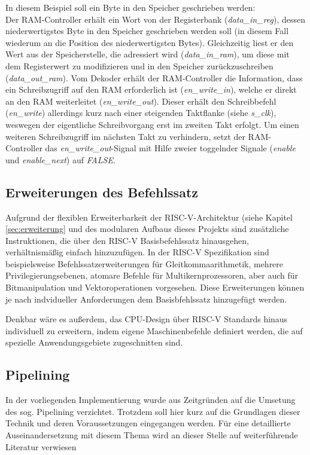 In diesem Beispiel soll ein Byte in den Speicher geschrieben werden:\\
Der RAM-Controller erhält ein Wort von der Registerbank (\textit{data\_in\_reg}), dessen niederwertigstes Byte in den Speicher geschrieben werden soll (in diesem Fall wiederum an die Position des niederwertigsten Bytes).
Gleichzeitig liest er den Wert aus der Speicherstelle, die adressiert wird  (\textit{data\_in\_ram}), um diese mit dem Registerwert zu modifizieren und in den Speicher zurückzuschreiben (\textit{data\_out\_ram}).
Vom Dekoder erhält der RAM-Controller die Information, dass ein Schreibzugriff auf den RAM erforderlich ist (\textit{en\_write\_in}), welche er direkt an den RAM weiterleitet (\textit{en\_write\_out}).
Dieser erhält den Schreibbefehl (\textit{en\_write}) allerdings kurz nach einer steigenden Taktflanke (siehe \textit{s\_clk}), weswegen der eigentliche Schreibvorgang erst im zweiten Takt erfolgt.
Um einen weiteren Schreibzugriff im nächsten Takt zu verhindern, setzt der RAM-Controller das \textit{en\_write\_out}-Signal  mit Hilfe zweier toggelnder Signale (\textit{enable} und \textit{enable\_next}) auf \textit{FALSE}.




\subsection{Erweiterungen des Befehlssatz}

Aufgrund der flexiblen Erweiterbarkeit der RISC-V-Architektur (siehe Kapitel \ref{sec:erweiterung} und des modularen Aufbaus dieses Projekts sind zusätzliche Instruktionen, die über den RISC-V Basisbefehlssatz hinausgehen, verhältnismäßig einfach hinzuzufügen. In der RISC-V Spezifikation sind beispielsweise Befehlssatzerweiterungen für Gleitkommaarithmetik, mehrere Privilegierungsebenen, atomare Befehle für Multikernprozessoren, aber auch für Bitmanipulation und Vektoroperationen vorgesehen. \cite[S. 4f.]{RISC} Diese Erweiterungen können je nach indvidueller Anforderungen dem Basisbfehlssatz hinzugefügt werden.
 
Denkbar wäre es außerdem, das CPU-Design über RISC-V Standards hinaus individuell zu erweitern, indem eigene Maschinenbefehle definiert werden, die auf spezielle Anwendungsgebiete zugeschnitten sind.

\subsection{Pipelining}
In der vorliegenden Implementierung wurde aus Zeitgründen auf die Umsetung des sog. Pipelining verzichtet. 
Trotzdem soll hier kurz auf die Grundlagen dieser Technik und deren Voraussetzungen eingegangen werden.
Für eine detaillierte Auseinandersetzung mit diesem Thema wird an dieser Stelle auf weiterführende Literatur verwiesen~\cite[A-2 ff.]{Hennessy}


